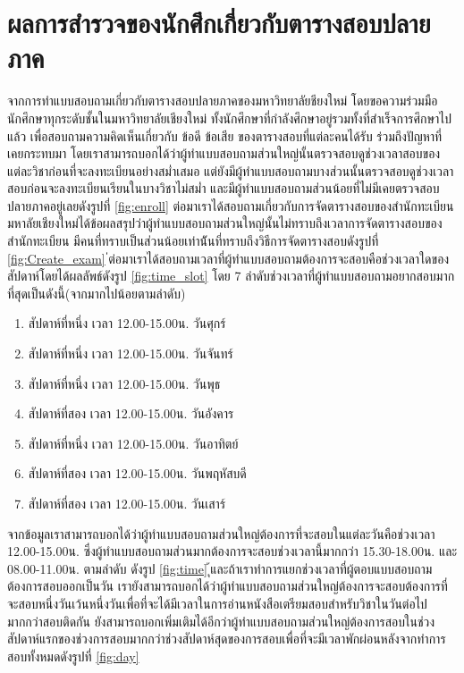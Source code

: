 \section{ผลการสำรวจของนักศึกเกี่ยวกับตารางสอบปลายภาค}
จากการทำแบบสอบถามเกี่ยวกับตารางสอบปลายภาคของมหาวิทยาลัยชียงใหม่ โดยขอความร่วมมือนักศึกษาทุกระดับชั้นในมหาวิทยาลัยเชียงใหม่ 
ทั้งนักศึกษาที่กำลังศึกษาอยู่รวมทั้งที่สำเร็จการศึกษาไปแล้ว เพื่อสอบถามความคิดเห็นเกี่ยวกับ ข้อดี ข้อเสีย ของตารางสอบที่แต่ละคนได้รับ 
ร่วมถึงปัญหาที่เคยกระทบมา โดยเราสามารถบอกได้ว่าผู้ทำแบบสอบถามส่วนใหญ่นั้นตรวจสอบดูช่วงเวลาสอบของแต่ละวิชาก่อนที่จะลงทะเบียนอย่างสม่ำเสมอ 
แต่ยังมีผู้ทำแบบสอบถามบางส่วนนั้นตรวจสอบดูช่วงเวลาสอบก่อนจะลงทะเบียนเรียนในบางวิชาไม่สม่ำ และมีผู้ทำแบบสอบถามส่วนน้อยที่ไม่มีเคยตรวจสอบปลายภาคอยู่เลยดังรูปที่ \ref{fig:enroll}
ต่อมาเราได้สอบถามเกี่ยวกับการจัดตารางสอบของสำนักทะเบียนมหาลัยเชียงใหม่ได้ข้อผลสรุปว่าผู้ทำแบบสอบถามส่วนใหญ่นั้นไม่ทราบถึงเวลาการจัดตารางสอบของสำนักทะเบียน มีคนที่ทราบเป็นส่วนน้อยเท่าน้ันที่ทราบถึงวิธีการจัดตารางสอบดังรูปที่ \ref{fig:Create_exam} 
่ต่อมาเราได้สอบถามเวลาที่ผู้ทำแบบสอบถามต้องการจะสอบคือช่วงเวลาใดของสัปดาห์โดยได้ผลลัพธ์ดังรูป \ref{fig:time_slot} โดย 7 ลำดับช่วงเวลาที่ผู้ทำแบบสอบถามอยากสอบมากที่สุดเป็นดังนี้(จากมากไปน้อยตามลำดับ)
\begin{enumerate}
  \item สัปดาห์ที่หนึ่ง เวลา 12.00-15.00น. วันศุกร์ 
  \item สัปดาห์ที่หนึ่ง เวลา 12.00-15.00น. วันจันทร์
  \item สัปดาห์ที่หนึ่ง เวลา 12.00-15.00น. วันพุธ
  \item สัปดาห์ที่สอง เวลา 12.00-15.00น. วันอังคาร
  \item สัปดาห์ที่หนึ่ง เวลา 12.00-15.00น. วันอาทิตย์
  \item สัปดาห์ที่สอง เวลา 12.00-15.00น. วันพฤหัสบดี
  \item สัปดาห์ที่สอง เวลา 12.00-15.00น. วันเสาร์
\end{enumerate}

จากข้อมูลเราสามารถบอกได้ว่าผู้ทำแบบสอบถามส่วนใหญ่ต้องการที่จะสอบในแต่ละวันคือช่วงเวลา 12.00-15.00น. ซึ่งผู้ทำแบบสอบถามส่วนมากต้องการจะสอบช่วงเวลานี้มากกว่า 15.30-18.00น. และ 08.00-11.00น. ตามลำดับ ดังรูป \ref{fig:time} 
ุ้และถ้าเราทำการแยกช่วงเวลาที่ผู้ตอบแบบสอบถามต้องการสอบออกเป็นวัน เรายังสามารถบอกได้ว่าผู้ทำแบบสอบถามส่วนใหญ่ต้องการจะสอบต้องการที่จะสอบหนึ่งวันเว้นหนึ่งวันเพื่อที่จะได้มีเวลาในการอ่านหนังสือเตรียมสอบสำหรับวิชาในวันต่อไปมากกว่าสอบติดกัน 
ยังสามารถบอกเพิ่มเติมได้อีกว่าผู้ทำแบบสอบถามส่วนใหญ่ต้องการสอบในช่วงสัปดาห์แรกของช่วงการสอบมากกว่าช่วงสัปดาห์สุดของการสอบเพื่อที่จะมีเวลาพักผ่อนหลังจากทำการสอบทั้งหมดดังรูปที่ \ref{fig:day}

